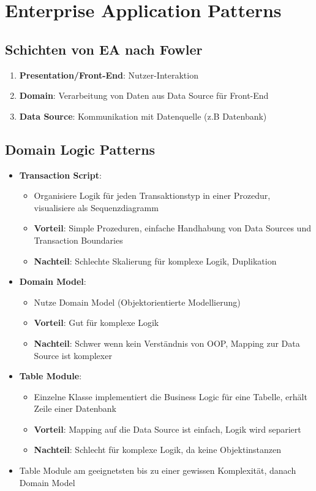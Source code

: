 \section{Enterprise Application Patterns}
\label{eap:sec:enterprise_application_patterns}

\subsection{Schichten von EA nach Fowler}
\label{eap:sub:schichten_von_ea_nach_fowler}

\begin{enumerate}
	\item \textbf{Presentation/Front-End}: Nutzer-Interaktion
	\item \textbf{Domain}: Verarbeitung von Daten aus Data Source für Front-End
	\item \textbf{Data Source}: Kommunikation mit Datenquelle (z.B Datenbank)
\end{enumerate}

\subsection{Domain Logic Patterns}
\label{eap:sub:domain_logic_patterns}


\begin{itemize}
	\item \textbf{Transaction Script}:
	\begin{itemize}
		\item Organisiere Logik für jeden Transaktionstyp in einer Prozedur, visualisiere als Sequenzdiagramm
		\item \textbf{Vorteil}: Simple Prozeduren, einfache Handhabung von Data Sources und Transaction Boundaries
		\item \textbf{Nachteil}: Schlechte Skalierung für komplexe Logik, Duplikation
	\end{itemize}
	\item \textbf{Domain Model}:
	\begin{itemize}
		\item Nutze Domain Model (Objektorientierte Modellierung)
		\item \textbf{Vorteil}: Gut für komplexe Logik
		\item \textbf{Nachteil}: Schwer wenn kein Verständnis von OOP, Mapping zur Data Source ist komplexer
	\end{itemize}
	\item \textbf{Table Module}:
	\begin{itemize}
		\item Einzelne Klasse implementiert die Business Logic für eine Tabelle, erhält Zeile einer Datenbank
		\item \textbf{Vorteil}: Mapping auf die Data Source ist einfach, Logik wird separiert
		\item \textbf{Nachteil}: Schlecht für komplexe Logik, da keine Objektinstanzen
	\end{itemize}
	\item Table Module am geeignetsten bis zu einer gewissen Komplexität, danach Domain Model
\end{itemize}


